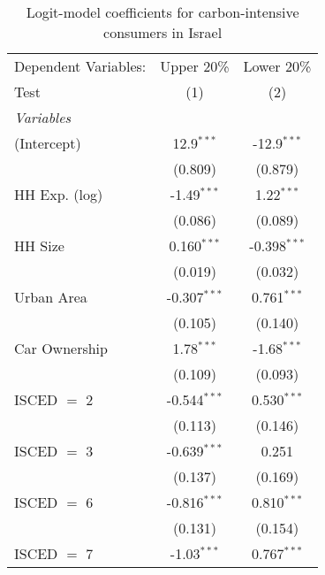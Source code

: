 
\begin{table}[htbp!]
   \centering
   \small
   \begin{adjustbox}{width = 1\textwidth, max height = 0.95\textheight, center}
      \begin{threeparttable}[b]
         \caption{\label{tab:Logit_1_ISR} Logit-model coefficients for carbon-intensive consumers in Israel}
         \begin{tabular}{lcc}
            \tabularnewline \midrule \midrule
            Dependent Variables: & Upper 20\%     & Lower 20\%\\   
            Test                 & (1)            & (2)\\  
            \midrule
            \emph{Variables}\\
            (Intercept)          & 12.9$^{***}$   & -12.9$^{***}$\\   
                                 & (0.809)        & (0.879)\\   
            HH Exp. (log)        & -1.49$^{***}$  & 1.22$^{***}$\\   
                                 & (0.086)        & (0.089)\\   
            HH Size              & 0.160$^{***}$  & -0.398$^{***}$\\   
                                 & (0.019)        & (0.032)\\   
            Urban Area           & -0.307$^{***}$ & 0.761$^{***}$\\   
                                 & (0.105)        & (0.140)\\   
            Car Ownership        & 1.78$^{***}$   & -1.68$^{***}$\\   
                                 & (0.109)        & (0.093)\\   
            ISCED $=$ 2          & -0.544$^{***}$ & 0.530$^{***}$\\   
                                 & (0.113)        & (0.146)\\   
            ISCED $=$ 3          & -0.639$^{***}$ & 0.251\\   
                                 & (0.137)        & (0.169)\\   
            ISCED $=$ 6          & -0.816$^{***}$ & 0.810$^{***}$\\   
                                 & (0.131)        & (0.154)\\   
            ISCED $=$ 7          & -1.03$^{***}$  & 0.767$^{***}$\\   

\end{tabular}
\end{threeparttable}
\end{adjustbox}
\end{table}
